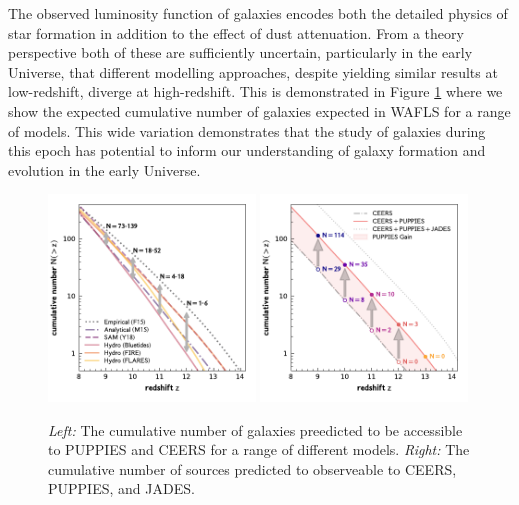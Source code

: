 \documentclass[12pt]{article}
\begin{document}
The observed luminosity function of galaxies encodes both the  detailed physics of star formation in addition to the effect of dust attenuation. From a theory perspective both of these are sufficiently uncertain, particularly in the early Universe, that different modelling approaches, despite yielding similar results at low-redshift, diverge at high-redshift. This is demonstrated in Figure \ref{fig:CN} where we show the expected cumulative number of galaxies expected in WAFLS for a range of models. This wide variation demonstrates that the study of galaxies during this epoch has potential to inform our understanding of galaxy formation and evolution in the early Universe.




\begin{figure}[h!]
    \centering
    \includegraphics[width=0.49\textwidth]{figs/CN_models.pdf}
    \includegraphics[width=0.49\textwidth]{figs/CN_surveys.pdf}
    \vspace{-10mm}
    \caption{\emph{Left:} The cumulative number of galaxies preedicted to be accessible to PUPPIES and CEERS for a range of different models. \emph{Right:} The cumulative number of sources predicted to observeable to CEERS, PUPPIES, and JADES. }
    \label{fig:CN}
\end{figure}
\end{document}
